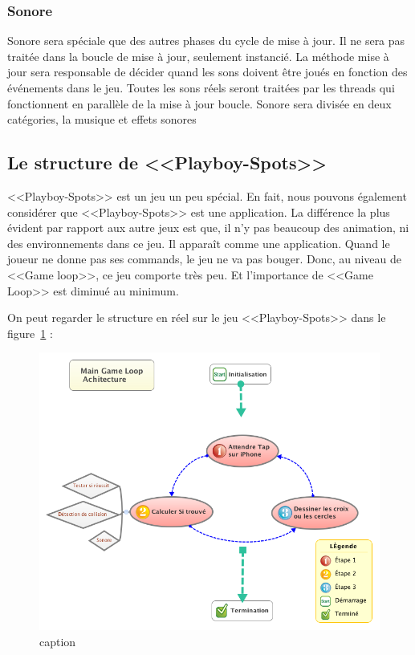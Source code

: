 
\subsubsection{Sonore} %
\label{ssub:sonore}

Sonore sera spéciale que des autres phases du cycle de mise à jour. Il ne sera pas traitée dans la boucle de mise à jour, seulement instancié. La méthode mise à jour sera responsable de décider quand les sons doivent être joués en fonction des événements dans le jeu. Toutes les sons réels seront traitées par les threads qui fonctionnent en parallèle de la mise à jour boucle. Sonore sera divisée en deux catégories, la musique et effets sonores



\subsection{Le structure de <<Playboy-Spots>>} %
\label{sub:le_structure_de_playboy_spots_}

<<Playboy-Spots>> est un jeu un peu spécial. En fait, nous pouvons également considérer que <<Playboy-Spots>> est une application. La différence la plus évident par rapport aux autre jeux est que, il n'y pas beaucoup des animation, ni des environnements dans ce jeu. Il apparaît comme une application. Quand le joueur ne donne pas ses commands, le jeu ne va pas bouger. Donc, au niveau de <<Game loop>>, ce jeu comporte très peu. Et l'importance de <<Game Loop>> est diminué au minimum. 

On peut regarder le structure en réel sur le jeu <<Playboy-Spots>> dans le figure~\ref{fig:XMinds_AchitecturePlayboy} :
\begin{figure}[htbp]
	\centering
		\includegraphics[width=6in]{XMinds/AchitecturePlayboy.png}
	\caption{caption}
	\label{fig:XMinds_AchitecturePlayboy}
\end{figure}
 

